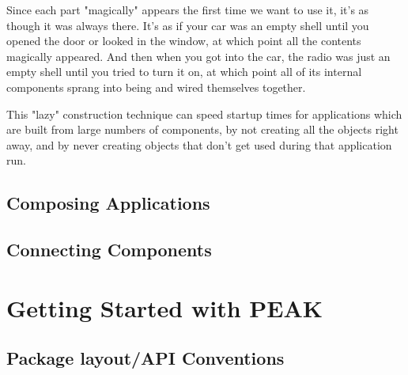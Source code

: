 Since each part "magically" appears the first time we want to use it, it's
as though it was always there.  It's as if your car was an empty shell until
you opened the door or looked in the window, at which point all the contents
magically appeared.  And then when you got into the car, the radio was just
an empty shell until you tried to turn it on, at which point all of its
internal components sprang into being and wired themselves together.

This "lazy" construction technique can speed startup times for applications
which are built from large numbers of components, by not creating all the
objects right away, and by never creating objects that don't get used during
that application run.

\subsection{Composing Applications}

\subsection{Connecting Components}


\section{Getting Started with PEAK}

\subsection{Package layout/API Conventions}


